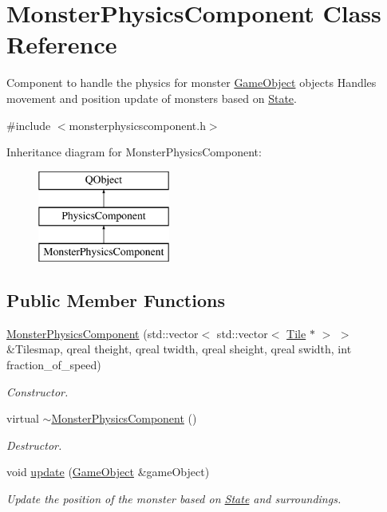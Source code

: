 \hypertarget{classMonsterPhysicsComponent}{\section{Monster\-Physics\-Component Class Reference}
\label{classMonsterPhysicsComponent}
}


Component to handle the physics for monster \hyperlink{classGameObject}{Game\-Object} objects Handles movement and position update of monsters based on \hyperlink{classState}{State}.  




{\ttfamily \#include $<$monsterphysicscomponent.\-h$>$}

Inheritance diagram for Monster\-Physics\-Component\-:\begin{figure}[H]
\begin{center}
\leavevmode
\includegraphics[height=3.000000cm]{classMonsterPhysicsComponent}
\end{center}
\end{figure}
\subsection*{Public Member Functions}
\begin{DoxyCompactItemize}
\item 
\hyperlink{classMonsterPhysicsComponent_a38c2ebc955ad3ac8fc03b0fa6452ed6e}{Monster\-Physics\-Component} (std\-::vector$<$ std\-::vector$<$ \hyperlink{classTile}{Tile} $\ast$ $>$ $>$ \&Tilesmap, qreal theight, qreal twidth, qreal sheight, qreal swidth, int fraction\-\_\-of\-\_\-speed)
\begin{DoxyCompactList}\small\item\em Constructor. \end{DoxyCompactList}\item 
\hypertarget{classMonsterPhysicsComponent_a23a31d1b31465e71f3851ad01559b0fa}{virtual \hyperlink{classMonsterPhysicsComponent_a23a31d1b31465e71f3851ad01559b0fa}{$\sim$\-Monster\-Physics\-Component} ()}\label{classMonsterPhysicsComponent_a23a31d1b31465e71f3851ad01559b0fa}

\begin{DoxyCompactList}\small\item\em Destructor. \end{DoxyCompactList}\item 
void \hyperlink{classMonsterPhysicsComponent_a590efe1034e71fa0dc039d547926e2f2}{update} (\hyperlink{classGameObject}{Game\-Object} \&game\-Object)
\begin{DoxyCompactList}\small\item\em Update the position of the monster based on \hyperlink{classState}{State} and surroundings. \end{DoxyCompactList}\end{DoxyCompactItemize}
